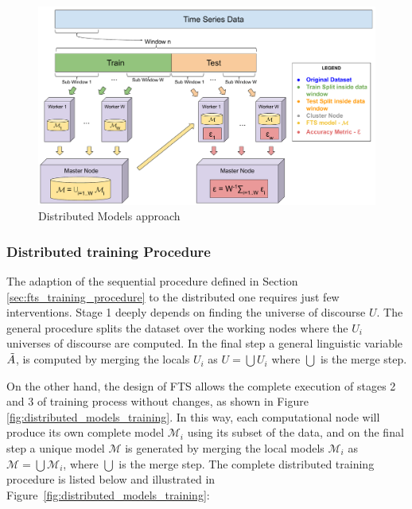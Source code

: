 \begin{figure}[htb]
    \centering
    \includegraphics[width=\textwidth]{figures/distributed_models.pdf}
    \caption{Distributed Models approach}
    \label{fig:distributed_models}
\end{figure}


\subsubsection{Distributed training Procedure}
\label{sec:distributed_training}

The adaption of the sequential procedure defined in Section \ref{sec:fts_training_procedure} to the distributed one requires just few interventions. Stage 1 deeply depends on finding the universe of discourse $U$. The general procedure splits the dataset over the working nodes where the $U_i$ universes of discourse are computed. In the final step a general linguistic variable $\tilde{A}$, is computed by merging the locals $U_i$ as $U = \bigcup U_i$ where $\bigcup$ is the merge step.

On the other hand, the design of FTS allows the complete execution of stages 2 and 3 of training process without changes, as shown in Figure \ref{fig:distributed_models_training}. In this way, each computational node will produce its own complete model  $\mathcal{M}_i$ using its subset of the data, and on the final step a unique model  $\mathcal{M}$ is generated by merging the local models  $\mathcal{M}_i$ as  $\mathcal{M} = \bigcup \mathcal{M}_i$, where $\bigcup$ is the merge step. The complete distributed training procedure is listed below and illustrated in Figure~\ref{fig:distributed_models_training}:

